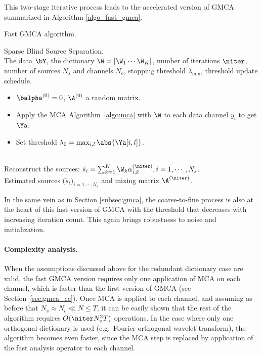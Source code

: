 This two-stage iterative process leads to the accelerated version of GMCA summarized in Algorithm \ref{algo_fast_gmca}.
{\linespread{1}
\begin{algorithm}[htb]
\caption{Fast GMCA algorithm.}
\label{algo_fast_gmca}
 Sparse Blind Source Separation.\\
 The data $\bY$, the dictionary $\W=[\W_1 \cdots \W_K]$, number of iterations $\niter$, number of sources $N_s$ and channels $N_c$, stopping threshold $\lambda_{\min}$, threshold update schedule.\\
\begin{itemize}
\item $\balpha^{(0)} = 0$,  $\A^{(0)}$ a random matrix.
\item Apply the MCA Algorithm~\ref{algo:mca} with $\W$ to each data channel $y_i$ to get $\Ya$.
\item Set threshold $\lambda_0 = \max_{i,l}\abs{\Ya[i,l]}$.
\end{itemize}
 \\
Reconstruct the sources: $\tilde{s}_i   =    \sum_{k=1}^K {\W}_{k}  \alpha^{(\niter)}_{i,k}, i=1,\cdots,N_s$.\\
 Estimated sources $\big(\tilde{s}_i\big)_{i=1,\cdots,N_s}$ and mixing matrix ${\A}^{(\niter)}$.
\end{algorithm}}

In the same vein as in Section \ref{subsec:gmca}, the coarse-to-fine process is also at the heart of this fast version of GMCA with the threshold that decreases with increasing iteration count. This again brings robustness to noise and initialization.

\paragraph*{Complexity analysis.} 
When the assumptions discussed above for the redundant dictionary case are valid, the fast GMCA version requires only one application of MCA on each channel, which is faster than the first version of GMCA (see Section~\ref{sec:gmca_cc}). Once MCA is applied to each channel, and assuming as before that $N_s \approx N_c \ll N \leq T$, it can be easily shown that the rest of the algorithm requires $O(\niter N_s^2T)$ operations. In the case where only one orthogonal dictionary is used (e.g.\ Fourier orthogonal wavelet transform), the algorithm becomes even faster, since the MCA step is replaced by application of the fast analysis operator to each channel.

